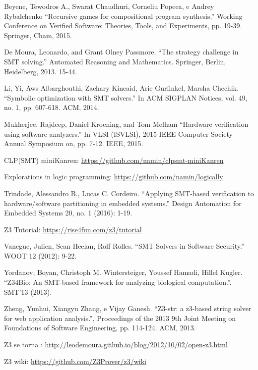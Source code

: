 \begin{thebibliography}{99}

 Beyene, Tewodros A., Swarat Chaudhuri, Corneliu
  Popeea, e Andrey Rybalchenko
  ``Recursive games for compositional program synthesis.''
  Working Conference on Verified Software: Theories, Tools, and
  Experiments, pp. 19-39. Springer, Cham, 2015.

 De Moura, Leonardo, and Grant Olney Passmore.
  ``The strategy challenge in SMT solving.''
  Automated Reasoning and Mathematics. Springer, Berlin, Heidelberg,
  2013. 15-44.
  
 Li, Yi, Aws Albarghouthi, Zachary Kincaid, Arie
  Gurfinkel,  Marsha Chechik.
  ``Symbolic optimization with SMT solvers.''
  In ACM SIGPLAN Notices, vol. 49, no. 1, pp. 607-618. ACM, 2014.

 Mukherjee, Rajdeep, Daniel Kroening, and Tom
  Melham
  ``Hardware verification using software analyzers.'' In VLSI
  (ISVLSI), 2015 IEEE Computer Society Annual Symposium on,
  pp. 7-12. IEEE, 2015.

 CLP(SMT) miniKanren:
  \url{https://github.com/namin/clpsmt-miniKanren}

 Explorations in logic programming:
  \url{https://github.com/namin/logically}
  
 Trindade, Alessandro B., Lucas C. Cordeiro.
  ``Applying SMT-based verification to hardware/software partitioning
  in embedded systems.''
  Design Automation for Embedded Systems 20, no. 1 (2016): 1-19.

 Z3 Tutorial: \url{https://rise4fun.com/z3/tutorial}
  
 Vanegue, Julien, Sean Heelan, Rolf Rolles.
  ``SMT Solvers in Software Security.'' WOOT 12 (2012): 9-22.
  
 Yordanov, Boyan, Christoph M. Wintersteiger,
  Youssef Hamadi, Hillel Kugler.
  ``Z34Bio: An SMT-based framework for analyzing biological
  computation.''. SMT’13 (2013).

 Zheng, Yunhui, Xiangyu Zhang, e Vijay Ganesh.
  ``Z3-str: a z3-based string solver for web application analysis.'',
  Proceedings of the 2013 9th Joint Meeting on Foundations of
  Software Engineering, pp. 114-124. ACM, 2013. 

 Z3 se torna :
  \url{http://leodemoura.github.io/blog/2012/10/02/open-z3.html}
  
 Z3 wiki: \url{https://github.com/Z3Prover/z3/wiki}
  
\end{thebibliography}

%

